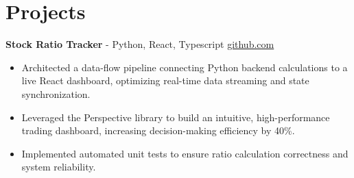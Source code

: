 \documentclass[11pt]{article}       %
\begin{document}

\vspace{-18.5pt}

\section*{Projects}

\textbf{Stock Ratio Tracker}{ - Python, React, Typescript} \hfill \href{https://github.com/Monica20030707/tradingDashboard-UI}{github.com} \\
\vspace{-9pt}
\begin{itemize}
  \item Architected a data-flow pipeline connecting Python backend calculations to a live React dashboard, optimizing real-time data streaming and state synchronization.
  \item Leveraged the Perspective library to build an intuitive, high-performance trading dashboard, increasing decision-making efficiency by 40\%.
  \item Implemented automated unit tests to ensure ratio calculation correctness and system reliability.
\end{itemize}

\end{document}
